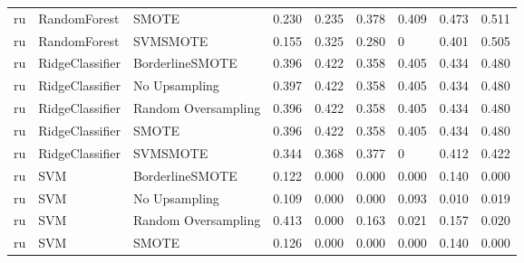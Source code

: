\begin{tabular}{lllllllll}
      ru &                 RandomForest &               SMOTE & 0.230 &                     0.235 &                 0.378 &                  0.409 &                                   0.473 &     0.511 \\
      ru &                 RandomForest &            SVMSMOTE & 0.155 &                     0.325 &                 0.280 &                      0 &                                   0.401 &     0.505 \\
      ru &              RidgeClassifier &     BorderlineSMOTE & 0.396 &                     0.422 &                 0.358 &                  0.405 &                                   0.434 &     0.480 \\
      ru &              RidgeClassifier &       No Upsampling & 0.397 &                     0.422 &                 0.358 &                  0.405 &                                   0.434 &     0.480 \\
      ru &              RidgeClassifier & Random Oversampling & 0.396 &                     0.422 &                 0.358 &                  0.405 &                                   0.434 &     0.480 \\
      ru &              RidgeClassifier &               SMOTE & 0.396 &                     0.422 &                 0.358 &                  0.405 &                                   0.434 &     0.480 \\
      ru &              RidgeClassifier &            SVMSMOTE & 0.344 &                     0.368 &                 0.377 &                      0 &                                   0.412 &     0.422 \\
      ru &                          SVM &     BorderlineSMOTE & 0.122 &                     0.000 &                 0.000 &                  0.000 &                                   0.140 &     0.000 \\
      ru &                          SVM &       No Upsampling & 0.109 &                     0.000 &                 0.000 &                  0.093 &                                   0.010 &     0.019 \\
      ru &                          SVM & Random Oversampling & 0.413 &                     0.000 &                 0.163 &                  0.021 &                                   0.157 &     0.020 \\
      ru &                          SVM &               SMOTE & 0.126 &                     0.000 &                 0.000 &                  0.000 &                                   0.140 &     0.000 \\

\end{tabular}
